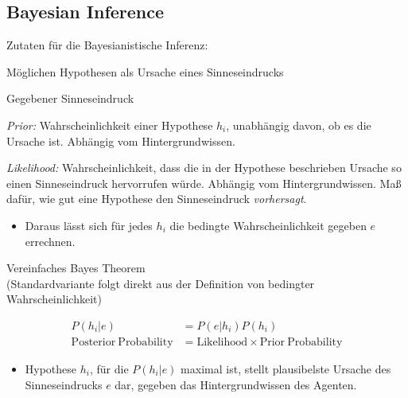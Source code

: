 \documentclass[12pt, handout]{beamer}
\begin{document}
\subsection{Bayesian Inference}

\begin{frame} 
  Zutaten für die Bayesianistische Inferenz:

  \begin{description}[xxxxxxxxx]
  \item[$h_1,...,h_n$] Möglichen Hypothesen als Ursache eines
    Sinneseindrucks
  \item[$e$] Gegebener Sinneseindruck
  \item[$P(h_i)$] \emph{Prior:} Wahrscheinlichkeit einer Hypothese
    $h_i$, unabhängig davon, ob es die Ursache ist. Abhängig vom
    Hintergrundwissen.
  \item[$P(e|h_i)$] \emph{Likelihood:} Wahrscheinlichkeit, dass die in
    der Hypothese beschrieben Ursache so einen Sinneseindruck
    hervorrufen würde. Abhängig vom Hintergrundwissen. Maß dafür, wie
    gut eine Hypothese den Sinneseindruck \emph{vorhersagt}.
  \end{description}

  \begin{itemize}[<+->]
  \item Daraus lässt sich für jedes $h_i$ die bedingte
    Wahrscheinlichkeit gegeben $e$ errechnen.
  \end{itemize}

\end{frame}

\begin{frame}

  Vereinfaches Bayes Theorem \\{\scriptsize (Standardvariante folgt
    direkt aus der Definition von bedingter Wahrscheinlichkeit)}

  \begin{align*}
    P(h_i|e) &= P(e|h_i)P(h_i) \\
    \mathrm{Posterior \: Probability} &= \mathrm{Likelihood} \times  \mathrm{Prior \: Probability}
  \end{align*}

  \begin{itemize}[<+->]
  \item Hypothese $h_i$, für die $P(h_i|e)$ maximal ist, stellt
    plausibelste Ursache des Sinneseindrucks $e$ dar, gegeben das
    Hintergrundwissen des Agenten.

  \end{itemize}

\end{frame}
\end{document}
